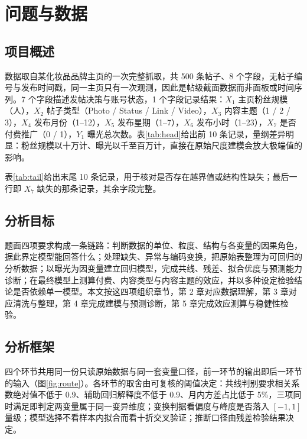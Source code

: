 \section{问题与数据}

\subsection{项目概述}

数据取自某化妆品品牌主页的一次完整抓取，共 500 条帖子、8 个字段，无帖子编号与发布时间戳，同一主页只有一次观测，因此是帖级截面数据而非面板或时间序列。7 个字段描述发帖决策与账号状态，1 个字段记录结果：$X_1$ 主页粉丝规模（人），$X_2$ 帖子类型（Photo / Status / Link / Video），$X_3$ 内容主题（1 / 2 / 3），$X_4$ 发布月份（1--12），$X_5$ 发布星期（1--7），$X_6$ 发布小时（1--23），$X_7$ 是否付费推广（0 / 1），$Y_1$ 曝光总次数。表\ref{tab:head}给出前 10 条记录，量纲差异明显：粉丝规模以十万计、曝光以千至百万计，直接在原始尺度建模会放大极端值的影响。



表\ref{tab:tail}给出末尾 10 条记录，用于核对是否存在越界值或结构性缺失；最后一行即 $X_7$ 缺失的那条记录，其余字段完整。



\subsection{分析目标}

题面四项要求构成一条链路：判断数据的单位、粒度、结构与各变量的因果角色，据此界定模型能回答什么；处理缺失、异常与编码变换，把原始表整理为可回归的分析数据；以曝光为因变量建立回归模型，完成共线、残差、拟合优度与预测能力诊断；在最终模型上测算付费、内容类型与内容主题的效应，并以多种设定检验结论是否依赖单一模型。本文按这四项组织章节，第 2 章对应数据理解，第 3 章对应清洗与整理，第 4 章完成建模与预测诊断，第 5 章完成效应测算与稳健性检验。

\subsection{分析框架}

四个环节共用同一份只读原始数据与同一套变量口径，前一环节的输出即后一环节的输入（图\ref{fig:route}）。各环节的取舍由可复核的阈值决定：共线判别要求相关系数绝对值不低于 0.9、辅助回归解释度不低于 0.9、月内方差占比低于 5\%，三项同时满足即判定两变量属于同一变异维度；变换判据看偏度与峰度是否落入 $[-1,1]$ 量级；模型选择不看样本内拟合而看十折交叉验证；推断口径由残差检验结果决定。

